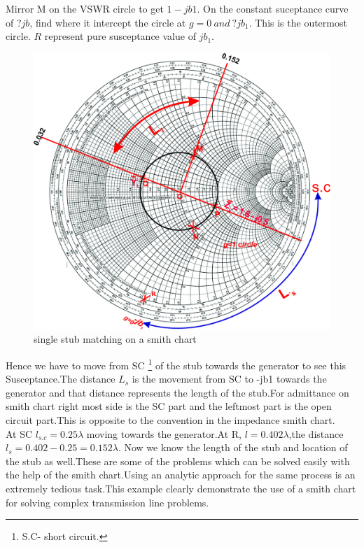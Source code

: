 \begin{example}
Mirror M on the VSWR circle to get $1-jb1$. On the constant suceptance curve of $?jb$, find where it intercept the circle at $g=0 \ and \ ?jb_1$. This is the outermost circle. $R$ represent pure susceptance value of $jb_1$. 
\begin{figure}[h]
\centering
\includegraphics[width=1\linewidth]{./graphics/fig14}
\caption{single stub matching on a smith chart}
\end{figure}

Hence we have to move from SC \footnote{S.C- short circuit.} of the stub towards the generator to see this Susceptance.The distance $L_s$ is the movement from SC to -jb1 towards the generator and that distance represents the length of the stub.For admittance on smith chart right most side is the SC part and the leftmost  part is the open circuit part.This is  opposite to the convention in the impedance smith chart.\\
At SC $l_{s.c}=0.25\lambda$ moving towards the generator.At R, $l=0.402\lambda$,the distance $l_s=0.402-0.25=0.152\lambda$. Now we know the length of the stub and location of the stub as well.These are some of the problems which can be solved easily with the help of the smith chart.Using an analytic approach for the same  process is an extremely tedious task.This example clearly demonstrate the use of a smith  chart for solving complex transmission line problems.
\end{example}

